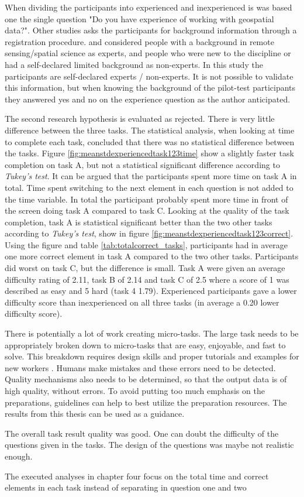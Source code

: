 When dividing the participants into experienced and inexperienced is was based one the single question "Do you have experience of working with geospatial data?". Other studies asks the participants for background information through a registration procedure. \cite{See2013} and \cite{Salk2016} considered people with a background in remote sensing/spatial science as experts, and people who were new to the discipline or had a self-declared limited background as non-experts. In this study the participants are self-declared experts / non-experts. It is not possible to validate this information, but when knowing the background of the pilot-test participants they answered yes and no on the experience question as the author anticipated. 

The second research hypothesis is evaluated as rejected. There is very little difference between the three tasks. The statistical analysis, when looking at time to complete each task, concluded that there was no statistical difference between the tasks. Figure \ref{fig:meanstdexperiencedtask123time} show a slightly faster task completion on task A, but not a statistical significant difference according to \textit{Tukey's test}. It can be argued that the participants spent more time on task A in total. Time spent switching to the next element in each question is not added to the time variable. In total the participant probably spent more time in front of the screen doing task A compared to task C. Looking at the quality of the task completion, task A is statistical significant better than the two other tasks according to \textit{Tukey's test}, show in figure \ref{fig:meanstdexperiencedtask123correct}. Using the figure and table \ref{tab:totalcorrect_tasks}, participants had in average one more correct element in task A compared to the two other tasks. Participants did worst on task C, but the difference is small. Task A were given an average difficulty rating of 2.11, task B of 2.14 and task C of 2.5  where a score of 1 was described as easy and 5 hard (task 4 1.79). Experienced participants gave a lower difficulty score than inexperienced on all three tasks (in average a 0.20 lower difficulty score).

There is potentially a lot of work creating micro-tasks. The large task needs to be appropriately broken down to micro-tasks that are easy, enjoyable, and fast to solve. This breakdown requires design skills and proper tutorials and examples for new workers \citep{Schulze2012}. Humans make mistakes and these errors need to be detected. Quality mechanisms also needs to be determined, so that the output data is of high quality, without errors. To avoid putting too much emphasis on the preparations, guidelines can help to best utilize the preparation resources. The results from this thesis can be used as a guidance. 

The overall task result quality was good. One can doubt the difficulty of the questions given in the tasks. The design of the questions was maybe not realistic enough. 

The executed analyses in chapter four focus on the total time and correct elements in each task instead of separating in question one and two 
